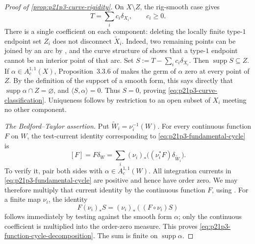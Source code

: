 \begin{proof}[Proof of \cref{prop:p21p3-curve-rigidity}]
On \(X\setminus Z\), the rig-smooth case gives
\[
                         T=\sum_i c_i\delta_{X_i},
                         \qquad c_i\geq0.
\]
There is a single coefficient on each component: deleting the locally
finite type-$1$ endpoint set \(Z_i\) does not disconnect
\(\widetilde X_i\).  Indeed, two remaining points can be joined by an arc
by \cite[\S12.1.12]{CLD25}, and the curve structure of
\cite[\S\S18.2.5--18.2.8]{CLD25} shows that a type-$1$ endpoint cannot be
an interior point of that arc.
Set
\(
 S:=T-\sum_i c_i\delta_{X_i}
\).  Then \(\operatorname{supp}S\subseteq Z\).  If
\(\alpha\in A_c^{1,1}(X)\), Proposition~3.3.6 of \cite{CLD25} makes
the germ of \(\alpha\) zero at every point of \(Z\).  By the definition
of the support of a smooth form, this says directly that
\(\operatorname{supp}\alpha\cap Z=\varnothing\), and
\(\langle S,\alpha\rangle=0\).  Thus \(S=0\), proving
\eqref{eq:p21p3-curve-classification}.  Uniqueness follows by
restriction to an open subset of \(X_i\) meeting no other component.

\smallskip
\emph{The Bedford--Taylor assertion.}
Put \(\widetilde W_i=\nu_i^{-1}(W)\).  For every continuous function
\(F\) on \(W\), the test-current identity corresponding to
\eqref{eq:p21p3-fundamental-cycle} is
\begin{equation}
\label{eq:p21p3-function-cycle-decomposition}
 [F]=F\delta_W
     =\sum_i(\nu_i)_*
        \bigl((\nu_i^*F)\delta_{\widetilde W_i}\bigr).
\end{equation}
To verify it, pair both sides with
\(\alpha\in A_c^{1,1}(W)\).  All integration currents in
\eqref{eq:p21p3-fundamental-cycle} are positive and hence have order zero.
We may therefore multiply that current identity by the continuous
function \(F\), using \cite[Example~7.2.12]{CLD25}.  For a finite map
\(\nu_i\), the identity
\[
 F(\nu_i)_*S=(\nu_i)_*((F\circ\nu_i)S)
\]
follows immediately by testing against the smooth form \(\alpha\); only
the continuous coefficient is multiplied into the order-zero measure.
This proves \eqref{eq:p21p3-function-cycle-decomposition}.  The sum is
finite on \(\operatorname{supp}\alpha\).


\end{proof}
